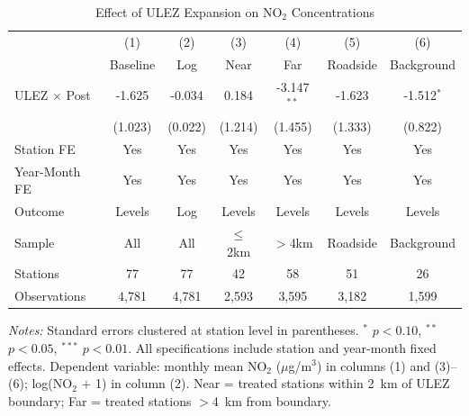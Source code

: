 \begin{table}[H]
\centering
\caption{Effect of ULEZ Expansion on NO$_2$ Concentrations}
\label{tab:main}
\begin{threeparttable}
\footnotesize
\setlength{\tabcolsep}{4pt}
\begin{tabular}{lcccccc}
\toprule
 & (1) & (2) & (3) & (4) & (5) & (6) \\
 & Baseline & Log & Near & Far & Roadside & Background \\
\midrule
ULEZ $\times$ Post & -1.625 & -0.034 & 0.184 & -3.147$^{**}$ & -1.623 & -1.512$^{*}$ \\
 & (1.023) & (0.022) & (1.214) & (1.455) & (1.333) & (0.822) \\
\addlinespace
Station FE & Yes & Yes & Yes & Yes & Yes & Yes \\
Year-Month FE & Yes & Yes & Yes & Yes & Yes & Yes \\
Outcome & Levels & Log & Levels & Levels & Levels & Levels \\
Sample & All & All & $\leq$2km & $>$4km & Roadside & Background \\
Stations & 77 & 77 & 42 & 58 & 51 & 26 \\
Observations & 4,781 & 4,781 & 2,593 & 3,595 & 3,182 & 1,599 \\
\bottomrule
\end{tabular}
\begin{tablenotes}[flushleft]
\scriptsize\sloppy
\item \textit{Notes:} Standard errors clustered at station level in parentheses. $^{*}$ $p<0.10$, $^{**}$ $p<0.05$, $^{***}$ $p<0.01$. All specifications include station and year-month fixed effects. Dependent variable: monthly mean NO$_2$ ($\mu$g/m$^3$) in columns (1) and (3)--(6); log(NO$_2$ + 1) in column (2). Near = treated stations within 2~km of ULEZ boundary; Far = treated stations $>$4~km from boundary.
\end{tablenotes}
\end{threeparttable}
\end{table}
